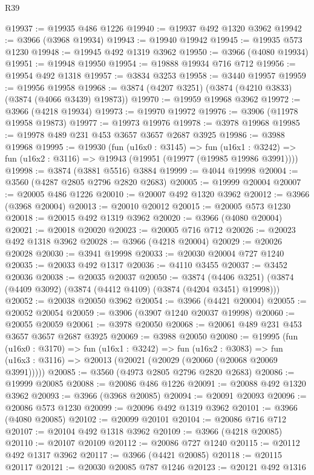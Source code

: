 \begin{lexlean}{R39}
\begin{coremodule}
@19937 := @19935 @486 @1226
@19940 := @19937 @492 @1320 @3962
@19942 := @3966 (@3968 @19934)
@19943 := @19940 @19942
@19945 := @19935 @573 @1230
@19948 := @19945 @492 @1319 @3962
@19950 := @3966 (@4080 @19934)
@19951 := @19948 @19950
@19954 := @19888 @19934 @716 @712
@19956 := @19954 @492 @1318
@19957 := @3834 @3253
@19958 := @3440 @19957
@19959 := @19956 @19958
@19968 := @3874 (@4207 @3251) (@3874 (@4210 @3833) (@3874 (@4066 @3439) @19873))
@19970 := @19959 @19968 @3962
@19972 := @3966 (@4218 @19934)
@19973 := @19970 @19972
@19976 := @3906 (@11978 @19958 @19873)
@19977 := @19973 @19976
@19978 := @3978 @19968
@19985 := @19978 @489 @231 @453 @3657 @3657 @2687 @3925
@19986 := @3988 @19968
@19995 := @19930
    (fun (u16x0 : @3145) =>
    fun (u16x1 : @3242) => fun (u16x2 : @3116) => @19943 (@19951 (@19977 (@19985 @19986 @3991))))
@19998 := @3874 (@3881 @5516) @3884
@19999 := @4044 @19998
@20004 := @3560 (@4287 @2805 @2796 @2820 @2683)
@20005 := @19999 @20004
@20007 := @20005 @486 @1226
@20010 := @20007 @492 @1320 @3962
@20012 := @3966 (@3968 @20004)
@20013 := @20010 @20012
@20015 := @20005 @573 @1230
@20018 := @20015 @492 @1319 @3962
@20020 := @3966 (@4080 @20004)
@20021 := @20018 @20020
@20023 := @20005 @716 @712
@20026 := @20023 @492 @1318 @3962
@20028 := @3966 (@4218 @20004)
@20029 := @20026 @20028
@20030 := @3941 @19998
@20033 := @20030 @20004 @727 @1240
@20035 := @20033 @492 @1317
@20036 := @4110 @3455
@20037 := @3452 @20036
@20038 := @20035 @20037
@20050 := @3874
    (@4406 @3251)
    (@3874 (@4409 @3092) (@3874 (@4412 @4109) (@3874 (@4204 @3451) @19998)))
@20052 := @20038 @20050 @3962
@20054 := @3966 (@4421 @20004)
@20055 := @20052 @20054
@20059 := @3906 (@3907 @1240 @20037 @19998)
@20060 := @20055 @20059
@20061 := @3978 @20050
@20068 := @20061 @489 @231 @453 @3657 @3657 @2687 @3925
@20069 := @3988 @20050
@20080 := @19995
    (fun (u16x0 : @3170) =>
    fun (u16x1 : @3242) =>
    fun (u16x2 : @3083) =>
    fun (u16x3 : @3116) => @20013 (@20021 (@20029 (@20060 (@20068 @20069 @3991)))))
@20085 := @3560 (@4973 @2805 @2796 @2820 @2683)
@20086 := @19999 @20085
@20088 := @20086 @486 @1226
@20091 := @20088 @492 @1320 @3962
@20093 := @3966 (@3968 @20085)
@20094 := @20091 @20093
@20096 := @20086 @573 @1230
@20099 := @20096 @492 @1319 @3962
@20101 := @3966 (@4080 @20085)
@20102 := @20099 @20101
@20104 := @20086 @716 @712
@20107 := @20104 @492 @1318 @3962
@20109 := @3966 (@4218 @20085)
@20110 := @20107 @20109
@20112 := @20086 @727 @1240
@20115 := @20112 @492 @1317 @3962
@20117 := @3966 (@4421 @20085)
@20118 := @20115 @20117
@20121 := @20030 @20085 @787 @1246
@20123 := @20121 @492 @1316

\end{coremodule}
\end{lexlean}
